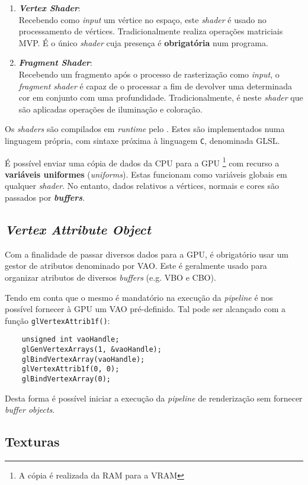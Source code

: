 \begin{enumerate}
    \item \textbf{\itshape Vertex Shader}:\\
    Recebendo como \textit{input} um vértice no espaço, este \textit{shader} é usado no processamento de vértices. Tradicionalmente realiza operações matriciais \ac{MVP}. É o único \textit{shader} cuja presença é \textbf{obrigatória} num programa.
    
    \item \textbf{\itshape Fragment Shader}:\\
    Recebendo um fragmento após o processo de rasterização como \textit{input}, o \textit{fragment shader} é capaz de o processar a fim de devolver uma determinada cor em conjunto com uma profundidade. Tradicionalmente, é neste \textit{shader} que são aplicadas operações de iluminação e coloração.
\end{enumerate}

Os \textit{shaders} são compilados em \textit{runtime} pelo \opengl. Estes são implementados numa linguagem própria, com sintaxe próxima à linguagem \verb|C|, denominada \acf{GLSL}.

É possível enviar uma cópia de dados da \ac{CPU} para a \ac{GPU} \footnote{A cópia é realizada da \ac{RAM} para a \ac{VRAM}} com recurso a \textbf{variáveis uniformes} (\textit{uniforms}). Estas funcionam como variáveis globais em qualquer \textit{shader}. No entanto, dados relativos a vértices, normais e cores são passados por \textbf{\textit{buffers}}.


\subsection{\textit{Vertex Attribute Object}}
\label{ssec::arte:opengl:vao}

Com a finalidade de passar diversos dados para a \ac{GPU}, é obrigatório usar um gestor de atributos denominado por \acf{VAO}. Este é geralmente usado para organizar atributos de diversos \textit{buffers} (e.g. \ac{VBO} e \ac{CBO}).

Tendo em conta que o mesmo é mandatório na execução da \textit{pipeline} é nos possível fornecer à \ac{GPU} um \ac{VAO} pré-definido. Tal pode ser alcançado com a função \verb|glVertexAttrib1f()|:

\begin{verbatim}
    unsigned int vaoHandle;
    glGenVertexArrays(1, &vaoHandle);
    glBindVertexArray(vaoHandle);
    glVertexAttrib1f(0, 0);
    glBindVertexArray(0);
\end{verbatim}

Desta forma é possível iniciar a execução da \textit{pipeline} de renderização sem fornecer \textit{buffer objects}.


\subsection{Texturas}
\label{ssec::arte:opengl:texturas}

\todo{}


